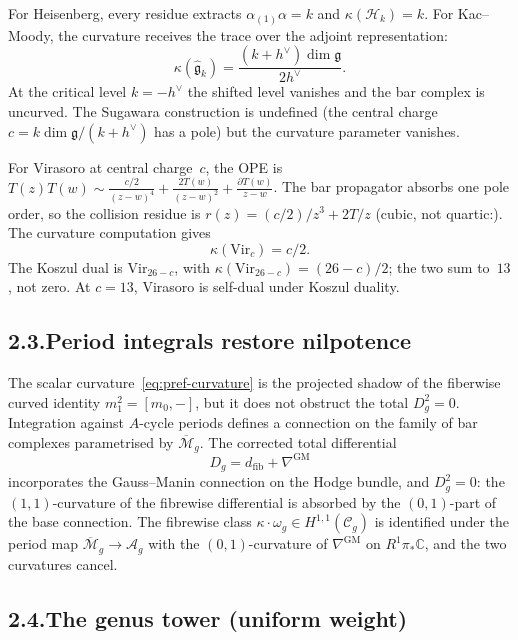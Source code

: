 \documentclass[11pt]{report}
\theoremstyle{definition}
\theoremstyle{remark}
\numberwithin{equation}{section}
\begin{document}
For Heisenberg, every residue extracts $\alpha_{(1)}\alpha=k$ and
$\kappa(\mathcal H_k)=k$. For Kac--Moody, the curvature receives the
trace over the adjoint representation:
\[
\kappa(\widehat{\mathfrak g}_k)=\frac{(k+h^\vee)\dim\mathfrak g}{2h^\vee}.
\]
At the critical level $k=-h^\vee$ the shifted level vanishes and the
bar complex is uncurved. The Sugawara construction is undefined (the
central charge $c=k\dim\mathfrak g/(k+h^\vee)$ has a pole) but the
curvature parameter vanishes.

For Virasoro at central charge~$c$, the OPE is
$T(z)T(w)\sim\tfrac{c/2}{(z-w)^4}+\tfrac{2T(w)}{(z-w)^2}+\tfrac{\partial T(w)}{z-w}$.
The bar propagator absorbs one pole order, so the collision
residue is $r(z)=(c/2)/z^3+2T/z$ (cubic, not quartic:).
The curvature computation gives
\[
\kappa(\mathrm{Vir}_c)=c/2.
\]
The Koszul dual is $\mathrm{Vir}_{26-c}$, with
$\kappa(\mathrm{Vir}_{26-c})=(26-c)/2$; the two sum to~$13$, not zero.
At $c=13$, Virasoro is self-dual under Koszul duality.

\subsection*{2.3.\enspace Period integrals restore nilpotence}

The scalar curvature~\eqref{eq:pref-curvature} is the projected shadow
of the fiberwise curved identity $m_1^2=[m_0,-]$, but it does not
obstruct the total $D_g^2=0$. Integration against $A$-cycle periods
defines a connection on the family of bar complexes parametrised by
$\overline{\mathcal M}_g$. The corrected total differential
\[
D_g=d_{\mathrm{fib}}+\nabla^{\mathrm{GM}}
\]
incorporates the Gauss--Manin connection on the Hodge bundle, and
$D_g^2=0$: the $(1,1)$-curvature of the fibrewise differential is
absorbed by the $(0,1)$-part of the base connection. The fibrewise
class $\kappa\cdot\omega_g\in H^{1,1}(\mathcal C_g)$ is identified
under the period map $\overline{\mathcal M}_g\to\mathcal A_g$ with
the $(0,1)$-curvature of $\nabla^{\mathrm{GM}}$ on $R^1\pi_*\mathbb C$,
and the two curvatures cancel.

\subsection*{2.4.\enspace The genus tower (uniform weight)}
\end{document}
